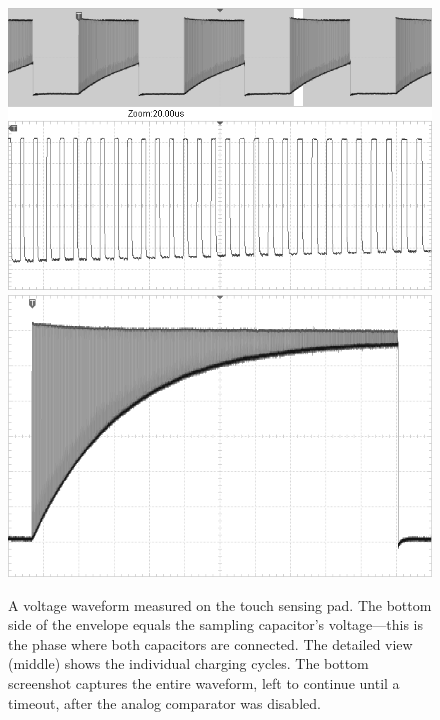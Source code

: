 \begin{figure}
	\centering
	\includegraphics[width=.9\textwidth] {img/tsc-wfm-bw.png} \\
	\vspace{5mm}
	\includegraphics[width=.9\textwidth] {img/tsc-wfm2-bw.png}
	\caption[TSC operation oscilloscope screenshots]{\label{fig:tsc-wfm}A voltage waveform measured on the touch sensing pad. The bottom side of the envelope equals the sampling capacitor's voltage---this is the phase where both capacitors are connected. The detailed view (middle) shows the individual charging cycles. The bottom screenshot captures the entire waveform, left to continue until a timeout, after the analog comparator was disabled.}
\end{figure}


